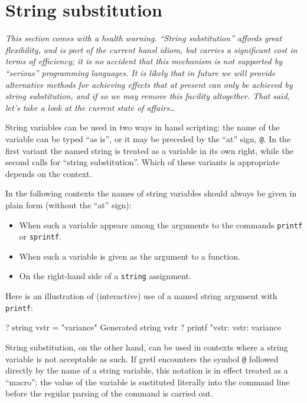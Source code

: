 \section{String substitution}
\label{sec:stringsub}

\textsl{This section comes with a health warning. ``String
  substitution'' affords great flexibility, and is part of the current
  hansl idiom, but carries a significant cost in terms of efficiency;
  it is no accident that this mechanism is not supported by
  ``serious'' programming languages. It is likely that in future we
  will provide alternative methods for achieving effects that at
  present can only be achieved by string substitution, and if so we
  may remove this facility altogether. That said, let's take a look at
  the current state of affairs\dots{}}

String variables can be used in two ways in hansl scripting: the name
of the variable can be typed ``as is'', or it may be preceded by the
``at'' sign, \verb|@|. In the first variant the named string is
treated as a variable in its own right, while the second calls for
``string substitution''. Which of these variants is appropriate
depends on the context.

In the following contexts the names of string variables should always
be given in plain form (without the ``at'' sign):

\begin{itemize}
\item When such a variable appears among the arguments to the
  commands \texttt{printf} or \texttt{sprintf}.
\item When such a variable is given as the argument to a function.
\item On the right-hand side of a \texttt{string} assignment.
\end{itemize}

Here is an illustration of (interactive) use of a named string
argument with \texttt{printf}:
%
\begin{code}
? string vstr = "variance"
Generated string vstr
? printf "vstr: %
vstr:     variance
\end{code}

String substitution, on the other hand, can be used in contexts where
a string variable is not acceptable as such. If gretl encounters
the symbol \verb|@| followed directly by the name of a string
variable, this notation is in effect treated as a ``macro'': the value
of the variable is sustituted literally into the command line before
the regular parsing of the command is carried out.

